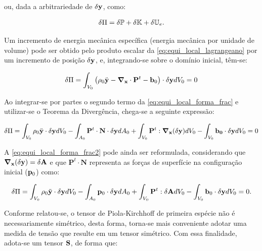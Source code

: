 \noindent ou, dada a arbitrariedade de $\delta\mathbf{y}$, como: 

\begin{align}
	\delta\Pi = \delta\mathbb{P} + \delta\mathbb{K} + \delta\mathbb{U}_e.
\end{align}

Um incremento de energia mecânica específica (energia mecânica por unidade de volume) pode ser obtido pelo produto escalar da \autoref{eq:equi_local_lagrangeano} por um incremento de posição $\delta\mathbf{y}$, e, integrando-se sobre o domínio inicial, têm-se:

\begin{align}
	\delta\Pi = \int_{V_0} \left(\rho_0 \ddot{\mathbf{y}} - \boldsymbol{\nabla}_{\mathbf{x}} \cdot \mathbf{P}^t -  \mathbf{b}_0 \right) \cdot  \delta\mathbf{y} dV_0 = 0 \label{eq:equi_local_forma_frac}
\end{align}

Ao integrar-se por partes o segundo termo da \autoref{eq:equi_local_forma_frac} e utilizar-se o Teorema da Divergência, chega-se a seguinte expressão:

\begin{align}
	\delta\Pi = \int_{V_0} \rho_0 \ddot{\mathbf{y}} \cdot \delta\mathbf{y} dV_0 - \int_{A_0} \mathbf{P}^t \cdot \mathbf{N} \cdot  \delta\mathbf{y} dA_0  + \int_{V_0} \mathbf{P}^t : \boldsymbol{\nabla}_{\mathbf{x}}(\delta\mathbf{y}) dV_0 - \int_{V_0} \mathbf{b_0} \cdot \delta \mathbf{y} dV_0 = 0 \label{eq:equi_local_forma_frac2}
\end{align}

A \autoref {eq:equi_local_forma_frac2} pode ainda ser reformulada, considerando que $\boldsymbol{\nabla}_{\mathbf{x}} (\delta\mathbf{y}) = \delta \mathbf{A}$ e que $\mathbf{P}^t \cdot \mathbf{N}$ representa as forças de superfície na configuração inicial ($\mathbf{p}_{0}$) como:

\begin{align}
\delta\Pi = \int_{V_{0}} \rho_{0} \ddot{\mathbf{y}} \cdot \delta\mathbf{y} dV_{0} - \int_{A_{0}} \mathbf{p}_{0} \cdot \delta\mathbf{y} dA_{0} + \int_{V_{0}} \mathbf{P}^{t} : \delta\mathbf{A} dV_{0} - \int_{V_{0}}  \mathbf{b}_0 \cdot \delta\mathbf{y} dV_{0} = 0. \label{eq:equi_local_forma_frac3}
\end{align}

Conforme relatou-se, o tensor de Piola-Kirchhoff de primeira espécie não é necessariamente simétrico, desta forma, torna-se mais conveniente adotar uma medida de tensão que resulte em um tensor simétrico. Com essa finalidade, adota-se um tensor $\mathbf{S}$, de forma que:

